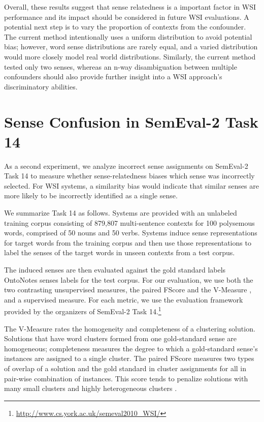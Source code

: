 \documentclass[11pt]{article}
\begin{document}
Overall, these results suggest that sense relatedness is a important factor in
WSI performance and its impact should be considered in future WSI evaluations.
A potential next step is to vary the proportion of contexts from the confounder.
The current method intentionally uses a uniform distribution to avoid potential
bias; however, word sense distributions are rarely equal, and a varied
distribution would more closely model real world distributions.  Similarly, the
current method tested only two senses, whereas an n-way disambiguation between
multiple confounders should also provide further insight into a WSI approach's
discriminatory abilities.

\section{Sense Confusion in SemEval-2 Task 14}
\label{sec:semeval}

As a second experiment, we analyze incorrect sense assignments on SemEval-2 Task
14 \cite{manandhar10semeval} to measure whether sense-relatedness biases which
sense was incorrectly selected. For WSI systems, a similarity bias would
indicate that similar senses are more likely to be incorrectly identified as a
single sense.

We summarize Task 14 as follows.  Systems are provided with an unlabeled
training corpus consisting of 879,807 multi-sentence contexts for 100 polysemous
words, comprised of 50 nouns and 50 verbs.  Systems induce sense representations
for target words from the training corpus and then use those representations to
label the senses of the target words in unseen contexts from a test corpus.

The induced senses are then evaluated against the gold standard labels OntoNotes
\cite{hovy06ontonotes} senses labels for the test corpus.  For our evaluation,
we use both the two contrasting unsupervised measures, the paired FScore
\cite{artilse09role} and the V-Measure \cite{rosenberg07vmeasure}, and a
supervised measure.  For each metric, we use the evaluation framework provided by the organizers of
SemEval-2 Task 14.\footnote{\tiny\url{http://www.cs.york.ac.uk/semeval2010_WSI/}}

The V-Measure rates the homogeneity and completeness of a
clustering solution.  Solutions that have word clusters formed from one
gold-standard sense are homogeneous; completeness measures the degree to which a
gold-standard sense's instances are assigned to a single cluster.
%
The paired FScore measures two types of overlap of a solution and the gold
standard in cluster assignments for all in pair-wise combination of instances.
This score tends to penalize solutions with many small clusters and highly
heterogeneous clusters \cite{manandhar09semeval}.  
\end{document}
